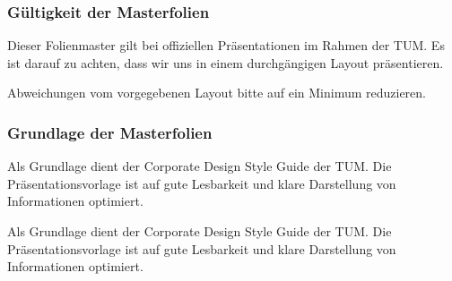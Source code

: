 


\begin{frame}
    \frametitle{Gültigkeit der Masterfolien}

Dieser Folienmaster gilt bei offiziellen Präsentationen im Rahmen der TUM. Es
ist darauf zu achten, dass wir uns in einem durchgängigen Layout präsentieren.

Abweichungen vom vorgegebenen Layout bitte auf ein Minimum reduzieren.

\end{frame}
\clearpage



\begin{frame}
    \frametitle{Grundlage der Masterfolien}

Als Grundlage dient der Corporate Design Style Guide der TUM.\newline
Die Präsentationsvorlage ist auf gute Lesbarkeit und klare Darstellung von
Informationen optimiert.

\end{frame}
\clearpage



\begin{frame}

Als Grundlage dient der Corporate Design Style Guide der TUM.\newline
Die Präsentationsvorlage ist auf gute Lesbarkeit und klare Darstellung von
Informationen optimiert.

\end{frame}
\clearpage


